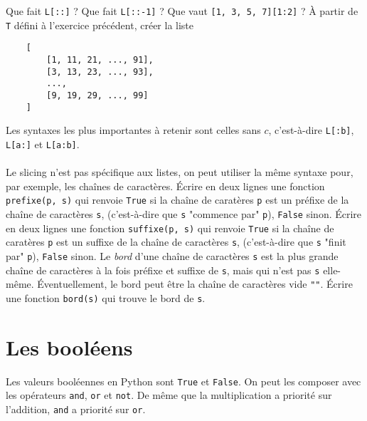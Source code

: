 \quessques Que fait \texttt{L[::]} ?
\ssques Que fait \texttt{L[::-1]} ?
\ssques Que vaut \texttt{[1, 3, 5, 7][1:2]} ?
\ssques À partir de \texttt{T} défini à l'exercice précédent, créer la liste 

\begin{verbatim}
    [
        [1, 11, 21, ..., 91],
        [3, 13, 23, ..., 93],
        ...,
        [9, 19, 29, ..., 99]
    ]
\end{verbatim}

Les syntaxes les plus importantes à retenir sont celles sans $ c $, c'est-à-dire \texttt{L[:b]}, \texttt{L[a:]} et \texttt{L[a:b]}.


\paragraph{} Le slicing n'est pas spécifique aux listes, on peut utiliser la même syntaxe pour, par exemple, les chaînes de caractères.
\quessques Écrire en deux lignes une fonction \texttt{prefixe(p, s)} qui renvoie \texttt{True} si la chaîne de caratères \texttt{p} est un préfixe de la chaîne de caractères \texttt{s}, (c'est-à-dire que \texttt{s} "commence par" \texttt{p}), \texttt{False} sinon.
\ssques Écrire en deux lignes une fonction \texttt{suffixe(p, s)} qui renvoie \texttt{True} si la chaîne de caratères \texttt{p} est un suffixe de la chaîne de caractères \texttt{s}, (c'est-à-dire que \texttt{s} "finit par" \texttt{p}), \texttt{False} sinon.
\ssques Le \textit{bord} d'une chaîne de caractères \texttt{s} est la plus grande chaîne de caractères à la fois préfixe et suffixe de \texttt{s}, mais qui n'est pas \texttt{s} elle-même. Éventuellement, le bord peut être la chaîne de caractères vide \texttt{""}. Écrire une fonction \texttt{bord(s)} qui trouve le bord de \texttt{s}.

\section{Les booléens}

Les valeurs booléennes en Python sont \texttt{True} et \texttt{False}. On peut les composer avec les opérateurs \texttt{and}, \texttt{or} et \texttt{not}. De même que la multiplication a priorité sur l'addition, \texttt{and} a priorité sur \texttt{or}.

